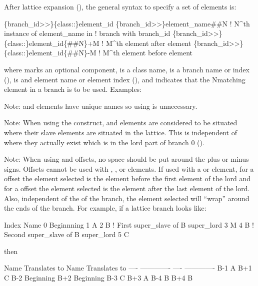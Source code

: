 {{{{{\vspace*{1pt}
After lattice expansion (), the general syntax to specify a set of elements is:
\begin{example}
  \{branch_id>>\}\{class::\}element_id
  \{branch_id>>\}element_name##N                 ! N^th instance of element_name in 
                                               !        branch with branch_id
  \{branch_id>>\}\{class::\}element_id\{##N\}+M  ! M^th element after element
  \{branch_id>>\}\{class::\}element_id\{##N\}-M  ! M^th element before element
\end{example}
where  marks an optional component,  is a class name,  is a
branch name or index (),  is and element name or element index
(), and  indicates that the N\Th matching element in a branch is to be
used. Examples:
Note:  and  elements have unique names so using \vn{\#\#} is unnecessary.

Note: When using the \vn{\#\#} construct,  and  elements are considered 
to be situated where their slave elements are situated in the lattice. This is independent of where
they actually exist which is in the lord part of branch 0 ().

Note: When using  and  offsets, no space should be put around the plus or minus signs.
Offsets cannot be used with , ,  or 
elements. If used with a  or  element, for a  offset the element
selected is the \Th element before the first  element of the lord and for a 
offset the element selected is the \Th element after the last  element of the
lord. Also, independent of the  of the branch, the element selected will ``wrap''
around the ends of the branch.  For example, if a lattice branch looks like:
\pagebreak[2]
\begin{example}
  Index  Name
    0    Beginnning
    1    A
    2    B       ! First super_slave of B super_lord
    3    M
    4    B       ! Second super_slave of B super_lord
    5    C
\end{example}
then
\begin{example}
    Name  Translates to     Name  Translates to
    ----  -------------     ----  -------------
    B-1   A                 B+1   C
    B-2   Beginning         B+2   Beginning
    B-3   C                 B+3   A
    B-4   B               B+4   B
\end{example}

}}}}}
